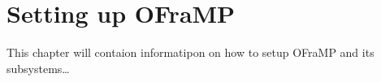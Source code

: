 \chapter{Setting up OFraMP}

\wip

This chapter will contaion informatipon on how to setup OFraMP and its subsystems\ldots

\nlipsum
